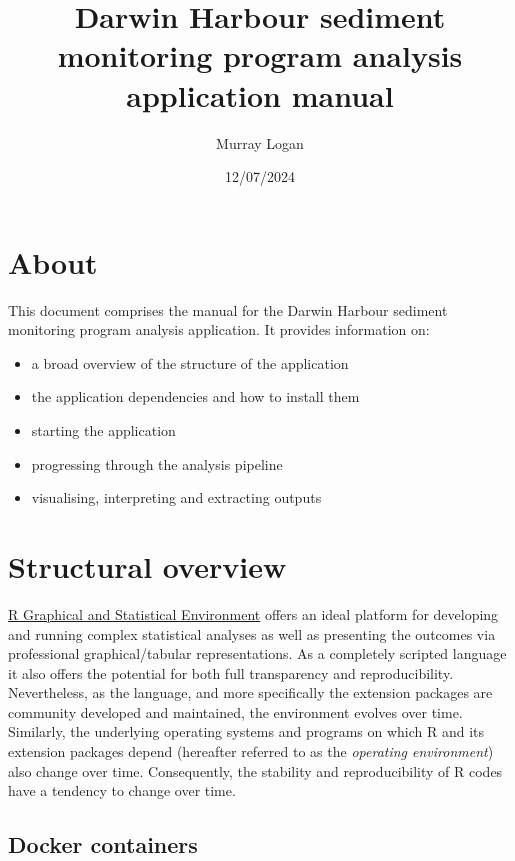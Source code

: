 \documentclass[
  8pt,
  a4paper]{article}
\title{Darwin Harbour sediment monitoring program analysis application
manual}
\author{Murray Logan}
\date{12/07/2024}
\providecommand{\tightlist}{%
  \setlength{\itemsep}{0pt}\setlength{\parskip}{0pt}}\usepackage{longtable,booktabs,array}
\renewcommand*\contentsname{Table of contents}
\newcommand\contentsname{Table of contents}
\begin{document}
\maketitle

\renewcommand*\contentsname{Table of contents}
{
\hypersetup{linkcolor=}
\setcounter{tocdepth}{3}
\tableofcontents
}

\section{About}\label{about}

This document comprises the manual for the Darwin Harbour sediment
monitoring program analysis application. It provides information on:

\begin{itemize}
\tightlist
\item
  a broad overview of the structure of the application
\item
  the application dependencies and how to install them
\item
  starting the application
\item
  progressing through the analysis pipeline
\item
  visualising, interpreting and extracting outputs
\end{itemize}

\section{Structural overview}\label{structural-overview}

\href{https://www.r-project.org/}{R Graphical and Statistical
Environment} offers an ideal platform for developing and running complex
statistical analyses as well as presenting the outcomes via professional
graphical/tabular representations. As a completely scripted language it
also offers the potential for both full transparency and
reproducibility. Nevertheless, as the language, and more specifically
the extension packages are community developed and maintained, the
environment evolves over time. Similarly, the underlying operating
systems and programs on which R and its extension packages depend
(hereafter referred to as the \emph{operating environment}) also change
over time. Consequently, the stability and reproducibility of R codes
have a tendency to change over time.

\subsection{Docker containers}\label{docker-containers}
\end{document}
